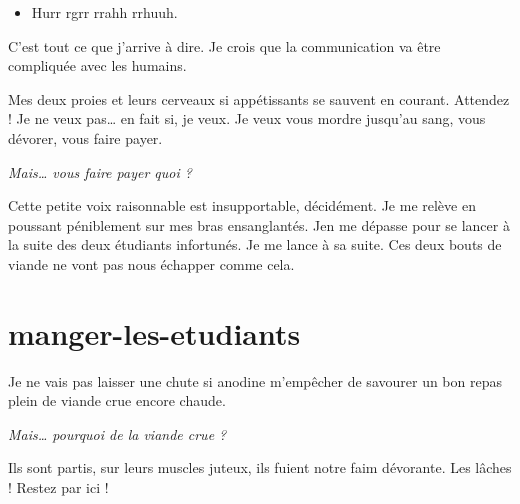 \begin{itemize}
\item Hurr rgrr rrahh rrhuuh.
\end{itemize}

C'est tout ce que j'arrive à dire. Je crois que la communication va être compliquée avec les humains.

Mes deux proies et leurs cerveaux si appétissants se sauvent en courant. Attendez ! Je ne veux pas… en fait si, je veux. Je veux vous mordre jusqu'au sang, vous dévorer, vous faire payer.

\textit{Mais… vous faire payer quoi ?}

Cette petite voix raisonnable est insupportable, décidément. Je me relève en poussant péniblement sur mes bras ensanglantés. Jen me dépasse pour se lancer à la suite des deux étudiants infortunés. Je me lance à sa suite. Ces deux bouts de viande ne vont pas nous échapper comme cela.

\section{manger-les-etudiants} 

Je ne vais pas laisser une chute si anodine m'empêcher de savourer un bon repas plein de viande crue encore chaude.

\textit{Mais… pourquoi de la viande crue ?}

Ils sont partis, sur leurs muscles juteux, ils fuient notre faim dévorante. Les lâches ! Restez par ici !